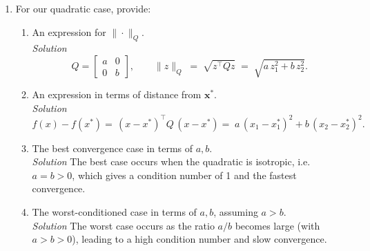 \documentclass[11pt]{article}
\begin{document}
\begin{enumerate}[label=\textbf{1(\alph*)}]
\begin{lstlisting}[style=matlabstyle,caption={Verification code for Problem 1(e)},label={lst:1e}]
[x_min, x_all, ~] = steepest_descent(fun, g_fun, x_0, vec_eps);
fprintf('Computed x* = %.6f (Analytical x* = 0, Error = %.2e)\n', x_min, abs(x_min));

x_vals = linspace(-2, 2, 200);
f_vals = arrayfun(fun, x_vals);

figure; hold on;
plot(x_vals, f_vals, 'b-');
plot(x_all(1,:), arrayfun(fun, x_all(1,:)), 'ro-', 'MarkerFaceColor','r');
xlabel('x_1'); ylabel('f(x)');
title('\bfVerification of Steepest Descent for f(x) = a x^2');
legend('f(x)', 'Iteration points', 'Location', 'northwest');
grid on;
saveas(gcf, fullfile('plots','1e.png'));
		\end{lstlisting}
		
		\newpage
		\item For our quadratic case, provide:
		\begin{enumerate}[label=\roman*.]
			\item An expression for $\|\cdot\|_Q$.\\
			\textit{Solution}
			\[
			Q=\begin{bmatrix}a&0\\[2pt]0&b\end{bmatrix},\qquad
			\|z\|_Q \;=\; \sqrt{z^\top Q z}
			\;=\; \sqrt{a\,z_1^2 + b\,z_2^2}.
			\]
			\item An expression in terms of distance from $\bm{x}^\ast$.\\
			\textit{Solution}
			\[
			f(x)-f(x^\ast)
			=\,(x-x^\ast)^\top Q\,(x-x^\ast)
			=\;a\,(x_1-x_1^\ast)^2 + b\,(x_2-x_2^\ast)^2 .
			\]
			
			\item The best convergence case in terms of $a,b$.\\
			\textit{Solution}
			The best case occurs when the quadratic is isotropic, i.e.\ \(a=b>0\), which gives a condition number of 1 and the fastest convergence.
			
			\item The worst-conditioned case in terms of $a,b$, assuming $a>b$.\\
			\textit{Solution}
			The worst case occurs as the ratio \(a/b\) becomes large (with \(a>b>0\)), leading to a high condition number and slow convergence.
			
		\end{enumerate}
		

\end{enumerate}
\end{document}
